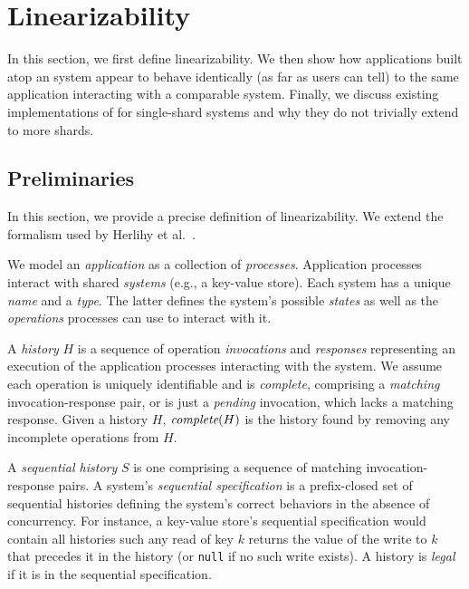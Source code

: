 \section{\Multidispatch{} Linearizability}
\label{sec:mdl}

In this section, we first define \multidispatch{} linearizability. 
We then show how applications built atop an \MDL{} system appear
to behave identically (as far as users can tell) to the same application interacting
with a comparable \SDL{} system. Finally, we discuss existing implementations
of \MDL{} for single-shard systems and why they do not trivially extend to more
shards. 

\subsection{Preliminaries}
\label{sec:mdl:preliminaries}

In this section, we provide a precise definition of \multidispatch{} linearizability.
We extend the formalism used by Herlihy et al.~\cite{herlihy1990linearizability}.

We model an \textit{application} as a collection of \textit{processes}. Application
processes interact with shared \textit{systems} (e.g., a key-value store). Each system
has a unique \textit{name} and a \textit{type}. The latter defines the system's possible
\textit{states} as well as the \textit{operations} processes can use to interact with it.

A \textit{history} $H$ is a sequence of operation \textit{invocations} and \textit{responses}
representing an execution of the application processes interacting with the system.
We assume each operation is uniquely identifiable and is \textit{complete}, comprising
a \textit{matching} invocation-response pair, or is just a \textit{pending} invocation,
which lacks a matching response. Given a history $H$, $\operatorname*{\textit{complete}}(H)$ is the history
found by removing any incomplete operations from $H$.

A \textit{sequential history} $S$ is one comprising a sequence of matching invocation-response
pairs. A system's \textit{sequential specification} is a prefix-closed set of sequential histories
defining the system's correct behaviors in the absence of concurrency. For instance, a
key-value store's sequential specification would contain all histories such any read of key $k$
returns the value of the write to $k$ that precedes it in the history (or \texttt{null} if no
such write exists). A history is \textit{legal} if it is in the sequential specification.

